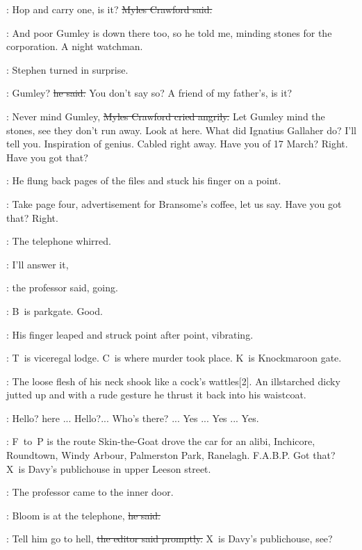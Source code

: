 \crawford:
Hop and carry one,
is it?
\sout{Myles Crawford said.}

\omaddenburke:
And poor Gumley is down there too,
so he told me,
minding stones for the corporation.
A night watchman.

:
Stephen turned in surprise.

\Stephen:
Gumley?
\sout{he said.}
You don't say so?
A friend of my father's,
is it?

\crawford:
Never mind Gumley,
\sout{Myles Crawford cried angrily.}
Let Gumley mind the stones,
see they don't run away.
Look at here.
What did Ignatius Gallaher do?
I'll tell you.
Inspiration of genius.
Cabled right away.
Have you  of 17 March?
Right.
Have you got that?

:
He flung back pages of the files
and stuck his finger on a point.

\crawford:
Take page four,
advertisement for Bransome's coffee,
let us say.
Have you got that?
Right.

:
The telephone whirred.



\machugh:
I'll answer it,

:
the professor said,
going.

\crawford:
B~is parkgate.
Good.

:
His finger leaped and struck point after point,
vibrating.

\crawford:
T~is viceregal lodge.
C~is where murder took place.
K~is Knockmaroon gate.

:
The loose flesh of his neck shook like a cock's wattles[2].
An illstarched dicky jutted up
and with a rude gesture
he thrust it back into his waistcoat.

\machugh:
Hello?
 here ...
Hello?...
Who's there? ...
Yes ...
Yes ...
Yes.

\crawford:
F~to~P is the route Skin-the-Goat drove the car for an alibi,
Inchicore, Roundtown, Windy Arbour, Palmerston Park, Ranelagh.
F.A.B.P.
Got that?
X~is Davy's publichouse in upper Leeson street.

:
The professor came to the inner door.

\machugh:
Bloom is at the telephone,
\sout{he said.}

\crawford:
Tell him go to hell,
\sout{the editor said promptly.}
X~is Davy's publichouse,
see?



